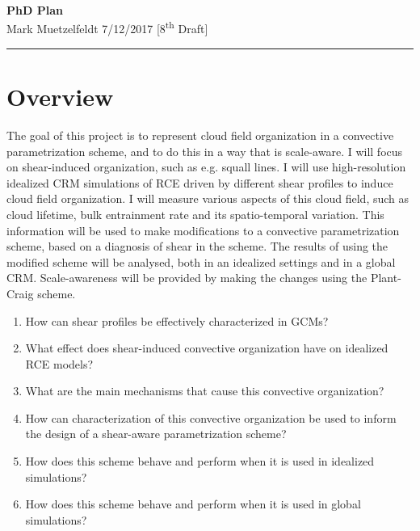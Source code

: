 \documentclass[11pt,a4paper]{article}
\newcommand{\ts}{\textsuperscript}
\begin{document}
\begin{center}
    \Large{\textbf{PhD Plan}}\\[0.15cm]
    \large{Mark Muetzelfeldt 7/12/2017 [8\ts{th} Draft]}\\ 
    \rule{\textwidth}{0.2mm}
\end{center}

\section*{Overview}

The goal of this project is to represent cloud field organization in a convective parametrization scheme, and to do this in a way that is scale-aware. I will focus on shear-induced organization, such as e.g. squall lines. I will use high-resolution idealized CRM simulations of RCE driven by different shear profiles to induce cloud field organization. I will measure various aspects of this cloud field, such as cloud lifetime, bulk entrainment rate and its spatio-temporal variation. This information will be used to make modifications to a convective parametrization scheme, based on a diagnosis of shear in the scheme. The results of using the modified scheme will be analysed, both in an idealized settings and in a global CRM. Scale-awareness will be provided by making the changes using the Plant-Craig scheme.

\begin{enumerate}
    \item How can shear profiles be effectively characterized in GCMs?
    \item What effect does shear-induced convective organization have on idealized RCE models?
    \item What are the main mechanisms that cause this convective organization?
    \item How can characterization of this convective organization be used to inform the design of a shear-aware parametrization scheme?
    \item  How does this scheme behave and perform when it is used in idealized simulations?
    \item  How does this scheme behave and perform when it is used in global simulations?
\end{enumerate}
\end{document}
